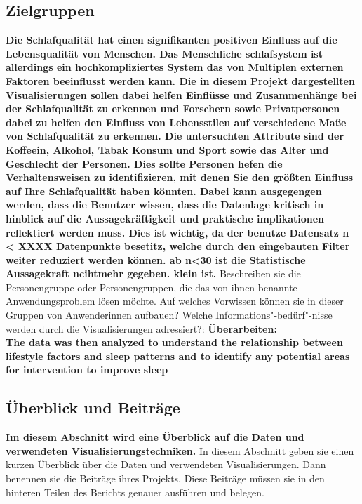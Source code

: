 \documentclass[usegeometry=true]{scrartcl}
\begin{document}
\subsection{Zielgruppen}
\textbf{Die Schlafqualität hat einen signifikanten positiven Einfluss auf die Lebensqualität von Menschen.  \cite*[The association between sleep quality and quality of life: a population-based study Sujin Lee a , Ji Hyun Kim c , Jae Ho Chung b, ]{2}  
Das Menschliche schlafsystem ist allerdings ein hochkompliziertes System das von Multiplen externen Faktoren beeinflusst werden kann.
Die in diesem Projekt dargestellten Visualisierungen sollen dabei helfen Einflüsse und Zusammenhänge bei der Schlafqualität zu erkennen und Forschern sowie Privatpersonen dabei zu helfen den Einfluss von Lebensstilen auf verschiedene Maße von Schlafqualität zu erkennen.
Die untersuchten Attribute sind der Koffeein, Alkohol, Tabak Konsum und Sport sowie das Alter und Geschlecht der Personen.
Dies sollte Personen hefen die Verhaltensweisen zu identifizieren, mit denen Sie den größten Einfluss auf Ihre Schlafqualität haben könnten. 
Dabei kann ausgegengen werden, dass die Benutzer wissen, dass die Datenlage kritisch in hinblick auf die Aussagekräftigkeit und praktische implikationen reflektiert werden muss. 
Dies ist wichtig, da der benutze Datensatz  n < XXXX Datenpunkte besetitz, welche durch den eingebauten Filter weiter reduziert werden können. ab n<30 ist die Statistische Aussagekraft ncihtmehr gegeben.  klein ist.  }
Beschreiben sie die Personengruppe oder Personengruppen, die das von ihnen benannte Anwendungsproblem lösen möchte.
 Auf welches Vorwissen können sie in dieser Gruppen von Anwenderinnen aufbauen? 
 Welche Informations"-bedürf"-nisse werden durch die Visualisierungen adressiert?:
\textbf{Überarbeiten: \\ The data was then analyzed to understand the relationship between lifestyle factors 
  and sleep patterns and to identify any potential areas for intervention to improve sleep \\}
\subsection{Überblick und Beiträge}
\textbf{Im diesem Abschnitt wird eine Überblick auf die Daten und verwendeten Visualisierungstechniken. }In diesem Abschnitt geben sie einen kurzen Überblick über die Daten und verwendeten Visualisierungen. Dann benennen sie die Beiträge ihres Projekts. Diese Beiträge müssen sie in den hinteren Teilen des Berichts genauer ausführen und belegen.
\end{document}
